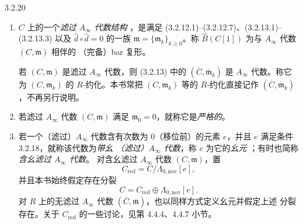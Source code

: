 \pagebreak
\begin{definition}{3.2.20}\label{def:3-2-20}
\begin{enumerate}[label=\textup{(\arabic*)},leftmargin=2.8em]
  \item $C$ 上的一个\emph{滤过 $A_\infty$ 代数结构}
  ，是满足
  (3.2.12.1)--(3.2.12.7)、(3.2.13.1)--(3.2.13.3) 以及
  $\widehat d\circ\widehat d=0$ 的一族
  $\mathfrak m=\{\mathfrak m_k\}_{k\geq0}$。称
  $\widehat B(C[1])$ 为与 $A_\infty$ 代数 $(C,\mathfrak m)$ 相伴的
  （完备）bar 复形。

  若 $(C,\mathfrak m)$ 是滤过 $A_\infty$ 代数，则
  (3.2.13) 中的
  $(\overline C,\overline{\mathfrak m}_k)$ 是 $A_\infty$ 代数。称它为
  $(C,\mathfrak m_k)$ 的 $R$-约化。本书常把
  $(C,\mathfrak m_k)$ 等的 $R$-约化直接记作
  $(\overline C,\overline{\mathfrak m}_k)$，不再另行说明。

  \item 若滤过 $A_\infty$ 代数 $(C,\mathfrak m)$ 满足
  $\mathfrak m_0=0$，就称它是\emph{严格的}。

  \item 若一个（滤过）$A_\infty$ 代数含有次数为 $0$（移位前）的元素
  $e$，并且 $e$ 满足条件 3.2.18，就称该代数为\emph{带幺
  （滤过）$A_\infty$ 代数}，称 $e$ 为它的\emph{幺元}
  ；有时也简称\emph{含幺滤过 $A_\infty$ 代数}。
  对含幺滤过 $A_\infty$ 代数 $(C,\mathfrak m)$，置
  \[
    C_{\mathrm{red}}=C/\Lambda_{0,\mathrm{nov}}[e],
  \]
  并且本书始终假定存在分裂
  \[
    C=C_{\mathrm{red}}\oplus\Lambda_{0,\mathrm{nov}}[e].
  \]
  对 $R$ 上的无滤过 $A_\infty$ 代数
  $(\overline C,\overline{\mathfrak m})$，也以同样方式定义幺元并假定上述
  分裂存在。关于 $C_{\mathrm{red}}$ 的一些讨论，见第 4.4.4、4.4.7 小节。
\end{enumerate}
\end{definition}

